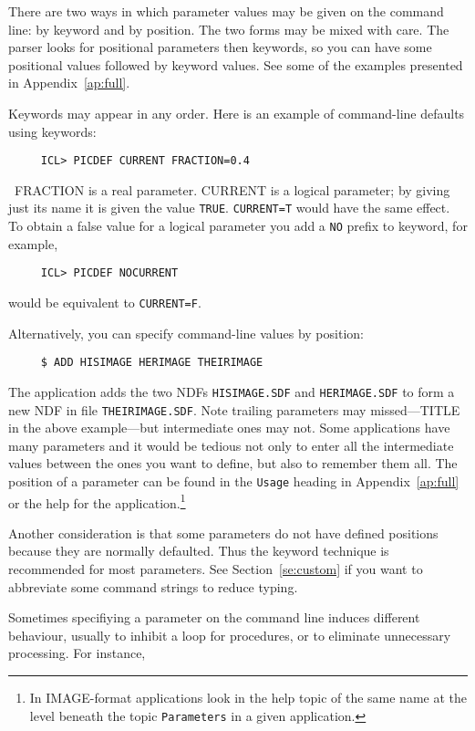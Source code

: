 There are two ways in which parameter values may be given on the
command line: by keyword and by position. The two forms may be
mixed with care. The parser looks for positional parameters then
keywords, so you can have some positional values followed by keyword
values.  See some of the examples presented in Appendix~\ref{ap:full}.

Keywords may appear in any order.
Here is an example of command-line defaults using keywords:

\small
\begin{verbatim}
     ICL> PICDEF CURRENT FRACTION=0.4
\end{verbatim}
\normalsize
~FRACTION is a real parameter.  CURRENT is a logical parameter; by giving
just its name it is given the value {\tt TRUE}. {\tt CURRENT=T} would
have the same effect.  To obtain a false value for a logical parameter
you add a {\tt NO} prefix to keyword, for example,

\small
\begin{verbatim}
     ICL> PICDEF NOCURRENT
\end{verbatim}
\normalsize
would be equivalent to {\tt CURRENT=F}.

Alternatively, you can specify command-line values by position:

\small
\begin{verbatim}
     $ ADD HISIMAGE HERIMAGE THEIRIMAGE
\end{verbatim}
\normalsize
The application adds the two NDFs {\tt HISIMAGE.SDF} and
{\tt HERIMAGE.SDF} to form a new NDF in file {\tt THEIRIMAGE.SDF}.  Note
trailing parameters may missed---TITLE in the above example---but
intermediate ones may not.  Some applications have many parameters and
it would be tedious not only to enter all the intermediate values
between the ones you want to define, but also to remember them all. The
position of a parameter can be found in the {\tt Usage} heading in
Appendix~\ref{ap:full} or the help for the application.\footnote{In
IMAGE-format applications look in the help topic of the same name at the
level beneath the topic {\tt Parameters} in a given application.}

Another consideration is that some parameters do not have defined positions
because they are normally defaulted. Thus the keyword technique is
recommended for most parameters.  See Section~\ref{se:custom} if you
want to abbreviate some command strings to reduce typing.

Sometimes specifiying a parameter on the command line induces different
behaviour, usually to inhibit a loop for procedures, or to eliminate
unnecessary processing.
For instance,

